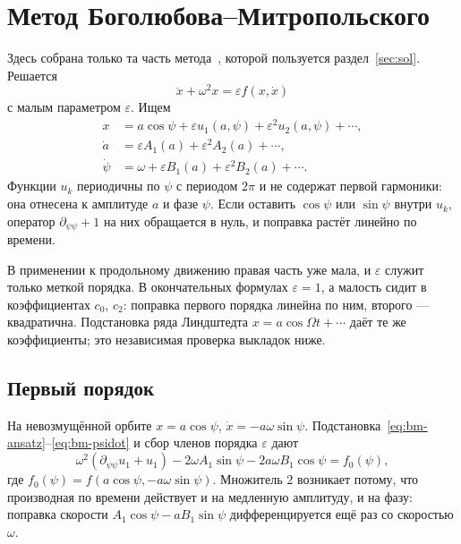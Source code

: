 \section{Метод Боголюбова--Митропольского}
\label{app:bm}

Здесь собрана только та часть метода~\cite{Bogoliubov1961}, которой пользуется раздел~\ref{sec:sol}. Решается
\begin{equation}
\label{eq:bm-eq}
\ddot x+\omega^2 x=\varepsilon f(x,\dot x)
\end{equation}
с малым параметром $\varepsilon$. Ищем
\begin{align}
x&=a\cos\psi+\varepsilon u_1(a,\psi)+\varepsilon^2 u_2(a,\psi)+\cdots,
\label{eq:bm-ansatz}\\
\dot a&=\varepsilon A_1(a)+\varepsilon^2 A_2(a)+\cdots,
\label{eq:bm-adot}\\
\dot\psi&=\omega+\varepsilon B_1(a)+\varepsilon^2 B_2(a)+\cdots.
\label{eq:bm-psidot}
\end{align}
Функции $u_k$ периодичны по $\psi$ с периодом $2\pi$ и не содержат первой гармоники: она отнесена к амплитуде $a$ и фазе $\psi$. Если оставить $\cos\psi$ или $\sin\psi$ внутри $u_k$, оператор $\partial_{\psi\psi}+1$ на них обращается в нуль, и поправка растёт линейно по времени.

В применении к продольному движению правая часть уже мала, и $\varepsilon$ служит только меткой порядка. В окончательных формулах $\varepsilon=1$, а малость сидит в коэффициентах $c_0$, $c_2$: поправка первого порядка линейна по ним, второго --- квадратична. Подстановка ряда Линдштедта $x=a\cos\Omega t+\cdots$ даёт те же коэффициенты; это независимая проверка выкладок ниже.

\subsection{Первый порядок}
\label{sec:bm-first}

На невозмущённой орбите $x=a\cos\psi$, $\dot x=-a\omega\sin\psi$. Подстановка~\eqref{eq:bm-ansatz}--\eqref{eq:bm-psidot} и сбор членов порядка $\varepsilon$ дают
\begin{equation}
\label{eq:bm-order1}
\omega^2(\partial_{\psi\psi}u_1+u_1)
-2\omega A_1\sin\psi
-2a\omega B_1\cos\psi
=f_0(\psi),
\end{equation}
где $f_0(\psi)=f(a\cos\psi,-a\omega\sin\psi)$. Множитель $2$ возникает потому, что производная по времени действует и на медленную амплитуду, и на фазу: поправка скорости $A_1\cos\psi-a B_1\sin\psi$ дифференцируется ещё раз со скоростью $\omega$.

